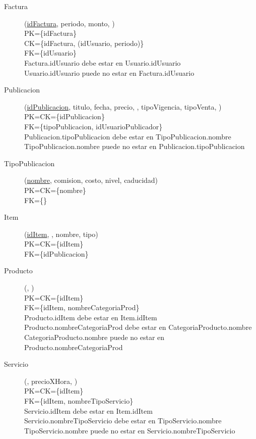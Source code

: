 \begin{description}
 \item[Factura](\underline{idFactura}, periodo, monto, )\\
PK=\{idFactura\}\\
CK=\{idFactura, (idUsuario, periodo)\}\\
FK=\{idUsuario\}\\
Factura.idUsuario debe estar en Usuario.idUsuario\\
Usuario.idUsuario puede no estar en Factura.idUsuario

 \item[Publicacion](\underline{idPublicacion}, titulo, fecha, precio, , tipoVigencia, tipoVenta, )\\
PK=CK=\{idPublicacion\}\\
FK=\{tipoPublicacion, idUsuarioPublicador\}\\
Publicacion.tipoPublicacion debe estar en TipoPublicacion.nombre\\
TipoPublicacion.nombre puede no estar en Publicacion.tipoPublicacion

 \item[TipoPublicacion](\underline{nombre}, comision, costo, nivel, caducidad)\\
PK=CK=\{nombre\}\\
FK=\{\}

 \item[Item](\underline{idItem}, , nombre, tipo)\\
PK=CK=\{idItem\}\\
FK=\{idPublicacion\}

 \item[Producto](\underline{}, )\\
PK=CK=\{idItem\}\\
FK=\{idItem, nombreCategoriaProd\}\\
Producto.idItem debe estar en Item.idItem\\
Producto.nombreCategoriaProd debe estar en CategoriaProducto.nombre\\
CategoriaProducto.nombre puede no estar en Producto.nombreCategoriaProd

 \item[Servicio](\underline{}, precioXHora, )\\
PK=CK=\{idItem\}\\
FK=\{idItem, nombreTipoServicio\}\\
Servicio.idItem debe estar en Item.idItem\\
Servicio.nombreTipoServicio debe estar en TipoServicio.nombre\\
TipoServicio.nombre puede no estar en Servicio.nombreTipoServicio


\end{description}
